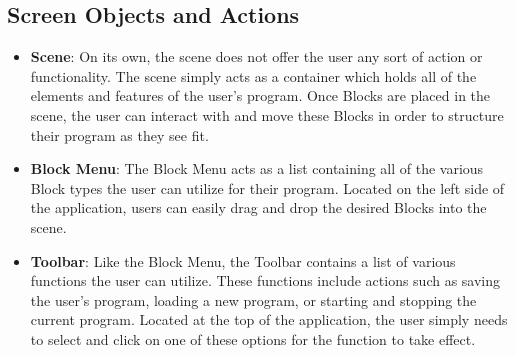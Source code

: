 \documentclass[journal,10pt,onecolumn,compsoc]{IEEEtran} \usepackage[margin=1.0in]{geometry} \usepackage{pdfpages}
\begin{document}
\subsection{Screen Objects and Actions}
\begin{itemize}
	\item \textbf{Scene}: On its own, the scene does not offer the user any sort of action or functionality.
    The scene simply acts as a container which holds all of the elements and features of the user's program.
    Once Blocks are placed in the scene, the user can interact with and move these Blocks in order to structure their program as they see fit.
    \item \textbf{Block Menu}: The Block Menu acts as a list containing all of the various Block types the user can utilize for their program.
    Located on the left side of the application, users can easily drag and drop the desired Blocks into the scene. 
    \item \textbf{Toolbar}: Like the Block Menu, the Toolbar contains a list of various functions the user can utilize.
    These functions include actions such as saving the user's program, loading a new program, or starting and stopping the current program.
    Located at the top of the application, the user simply needs to select and click on one of these options for the function to take effect. 
\end{itemize}

\newpage


\end{document}
